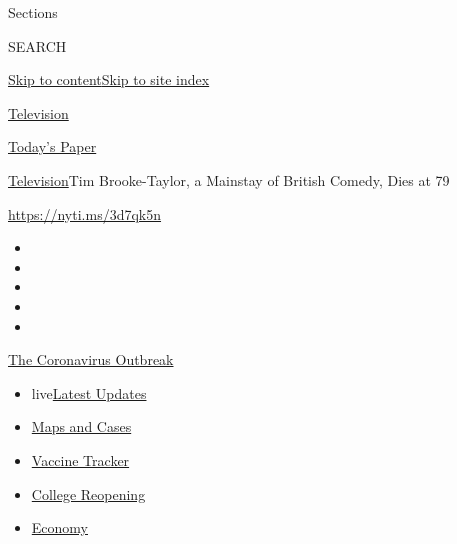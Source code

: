 Sections

SEARCH

\protect\hyperlink{site-content}{Skip to
content}\protect\hyperlink{site-index}{Skip to site index}

\href{https://www.nytimes3xbfgragh.onion/section/arts/television}{Television}

\href{https://myaccount.nytimes3xbfgragh.onion/auth/login?response_type=cookie\&client_id=vi}{}

\href{https://www.nytimes3xbfgragh.onion/section/todayspaper}{Today's
Paper}

\href{/section/arts/television}{Television}\textbar{}Tim Brooke-Taylor,
a Mainstay of British Comedy, Dies at 79

\url{https://nyti.ms/3d7qk5n}

\begin{itemize}
\item
\item
\item
\item
\item
\end{itemize}

\href{https://www.nytimes3xbfgragh.onion/news-event/coronavirus?action=click\&pgtype=Article\&state=default\&region=TOP_BANNER\&context=storylines_menu}{The
Coronavirus Outbreak}

\begin{itemize}
\tightlist
\item
  live\href{https://www.nytimes3xbfgragh.onion/2020/08/04/world/coronavirus-covid-19.html?action=click\&pgtype=Article\&state=default\&region=TOP_BANNER\&context=storylines_menu}{Latest
  Updates}
\item
  \href{https://www.nytimes3xbfgragh.onion/interactive/2020/us/coronavirus-us-cases.html?action=click\&pgtype=Article\&state=default\&region=TOP_BANNER\&context=storylines_menu}{Maps
  and Cases}
\item
  \href{https://www.nytimes3xbfgragh.onion/interactive/2020/science/coronavirus-vaccine-tracker.html?action=click\&pgtype=Article\&state=default\&region=TOP_BANNER\&context=storylines_menu}{Vaccine
  Tracker}
\item
  \href{https://www.nytimes3xbfgragh.onion/2020/08/02/us/covid-college-reopening.html?action=click\&pgtype=Article\&state=default\&region=TOP_BANNER\&context=storylines_menu}{College
  Reopening}
\item
  \href{https://www.nytimes3xbfgragh.onion/live/2020/08/03/business/stock-market-today-coronavirus?action=click\&pgtype=Article\&state=default\&region=TOP_BANNER\&context=storylines_menu}{Economy}
\end{itemize}

